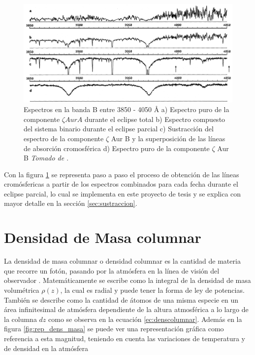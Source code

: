 \documentclass[12pt,oneside,openany,letter]{book}
\begin{document}
\begin{figure}[h]
    \centering
    \includegraphics[width=1\linewidth]{Images/espectro_zeta_aur.PNG}
    \caption[Espectros en la banda B entre 3850 - 4050 \r{A} del eclipse de $\zeta$ Aurigae de 1987.]{Espectros en la banda B entre 3850 - 4050 \r{A} a) Espectro puro de la componente $\zeta Aur A$ durante el eclipse total b) Espectro compuesto del sistema binario durante el eclipse parcial c) Sustracción del espectro de la componente $\zeta$ Aur B y la superposición de las líneas de absorción cromosférica d) Espectro puro de la componente $\zeta$ Aur B \textit{Tomado de \citep{kps9}}.}
    \label{fig:espectro_zaur}
\end{figure}


Con la figura \ref{fig:espectro_zaur} se representa paso a paso el proceso de obtención de las líneas cromósfericas a partir de los espectros combinados para cada fecha durante el eclipse parcial, lo cual se implementa en este proyecto de tesis y se explica con mayor detalle en la sección \ref{sec:sustraccion}.




\section{Densidad de Masa columnar}\label{sec:densidad_masa}
La densidad de masa columnar o densidad columnar es la cantidad de materia que recorre un fotón, pasando por la atmósfera en la línea de visión del observador \citep{carroll2017introduction}. Matemáticamente se escribe como la integral de la densidad de masa volumétrica $\rho (z)$, la cual es radial y puede tener la forma de ley de potencias. También se describe como la cantidad de átomos de una misma especie en un área infinitesimal de atmósfera dependiente de la altura atmosférica a lo largo de la columna $dz$ como se observa en la ecuación \ref{ec:denscolumnar}. Además en la figura \ref{fig:rep_dens_masa} se puede ver una representación gráfica como referencia a esta magnitud, teniendo en cuenta las variaciones de temperatura y de densidad en la atmósfera
\end{document}
